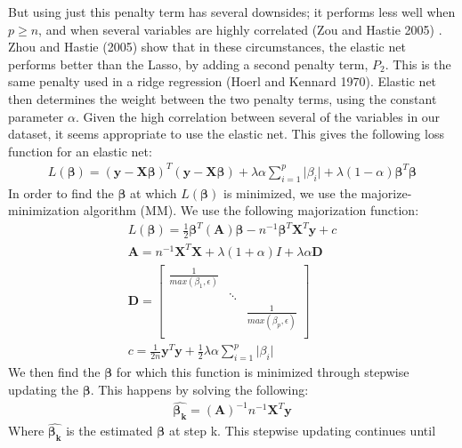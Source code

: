 \documentclass[
]{article}
\begin{document}
But using just this penalty term has several downsides; it performs less
well when \(p \geq n\), and when several variables are highly correlated
(Zou and Hastie 2005) . Zhou and Hastie (2005) show that in these
circumstances, the elastic net performs better than the Lasso, by adding
a second penalty term, \(P_2\). This is the same penalty used in a ridge
regression (Hoerl and Kennard 1970). Elastic net then determines the
weight between the two penalty terms, using the constant parameter
\(\alpha\). Given the high correlation between several of the variables
in our dataset, it seems appropriate to use the elastic net. This gives
the following loss function for an elastic net: \begin{align*}
    L(\boldsymbol{\beta}) = (\boldsymbol{y} - \mathbf{X}\boldsymbol{\beta})^T(\boldsymbol{y} - \mathbf{X}\boldsymbol{\beta}) + \lambda \alpha \sum_{i=1}^{p} \vert \beta_i \vert + \lambda (1-\alpha) \boldsymbol{\beta}^T\boldsymbol{\beta}
\end{align*} In order to find the \(\boldsymbol{\beta}\) at which
\(L(\boldsymbol{\beta})\) is minimized, we use the majorize-minimization
algorithm (MM). We use the following majorization function:
\begin{align*}
    L(\boldsymbol{\beta})=\frac{1}{2}\boldsymbol{\beta}^T(\mathbf{A})\boldsymbol{\beta} - n^{-1}\boldsymbol{\beta}^T\mathbf{X}^T\boldsymbol{y} + c \\
    \mathbf{A} = n^{-1}\mathbf{X}^T\mathbf{X} + \lambda(1+\alpha)I + \lambda \alpha \mathbf{D}\\
    \mathbf{D} = \begin{bmatrix}
    \frac{1}{max(\beta_1, \epsilon)} & & \\
    & \ddots & \\
    & & \frac{1}{max(\beta_p, \epsilon)} \\
  \end{bmatrix} \\
   c = \frac{1}{2n}\boldsymbol{y}^T\boldsymbol{y} + \frac{1}{2}\lambda\alpha  \sum_{i=1}^{p} \vert \beta_i \vert
\end{align*} We then find the \(\boldsymbol{\beta}\) for which this
function is minimized through stepwise updating the
\(\boldsymbol{\beta}\). This happens by solving the following:
\begin{align*}
   \hat{\boldsymbol{\beta_k}} = (\mathbf{A})^{-1}n^{-1}\mathbf{X}^T\boldsymbol{y}
\end{align*} Where \(\hat{\boldsymbol{\beta_k}}\) is the estimated
\(\boldsymbol{\beta}\) at step k. This stepwise updating continues until
\end{document}
